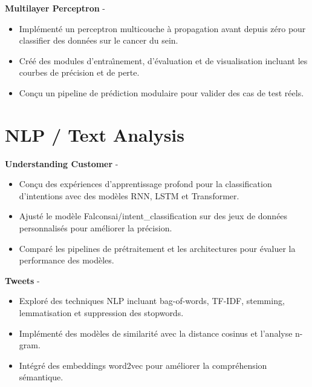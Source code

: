 \documentclass[a4paper,11pt]{article}%
\begin{document}
%
\noindent \textbf{Multilayer Perceptron} - \href{https://github.com/sboof911/Multilayer-Perceptron}{{}}%
\begin{itemize}[leftmargin=2em,label={},parsep=0pt,topsep=1em]%
\item Impl\'ement\'e un perceptron multicouche \`a propagation avant depuis z\'ero pour classifier des donn\'ees sur le cancer du sein.%
\item Cr\'e\'e des modules d'entra{\^\i}nement, d'\'evaluation et de visualisation incluant les courbes de pr\'ecision et de perte.%
\item Con\c{c}u un pipeline de pr\'ediction modulaire pour valider des cas de test r\'eels.%
\end{itemize}%
\section*{NLP / Text Analysis}%
%
\noindent \textbf{Understanding Customer} - \href{https://github.com/sboof911/Understanding-customer}{{}}%
\begin{itemize}[leftmargin=2em,label={},parsep=0pt,topsep=1em]%
\item Con\c{c}u des exp\'eriences d'apprentissage profond pour la classification d'intentions avec des mod\`eles RNN, LSTM et Transformer.%
\item Ajust\'e le mod\`ele Falconsai/intent\_classification sur des jeux de donn\'ees personnalis\'es pour am\'eliorer la pr\'ecision.%
\item Compar\'e les pipelines de pr\'etraitement et les architectures pour \'evaluer la performance des mod\`eles.%
\end{itemize}%
%
\noindent \textbf{Tweets} - \href{https://github.com/sboof911/tweets}{{}}%
\begin{itemize}[leftmargin=2em,label={},parsep=0pt,topsep=1em]%
\item Explor\'e des techniques NLP incluant bag-of-words, TF-IDF, stemming, lemmatisation et suppression des stopwords.%
\item Impl\'ement\'e des mod\`eles de similarit\'e avec la distance cosinus et l'analyse n-gram.%
\item Int\'egr\'e des embeddings word2vec pour am\'eliorer la compr\'ehension s\'emantique.%
\end{itemize}%
\end{document}

